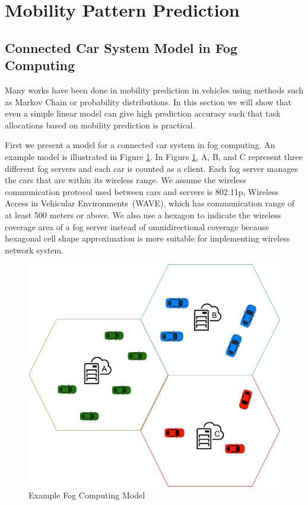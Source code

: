 \section{Mobility Pattern Prediction}
\label{s2}

\subsection{Connected Car System Model in Fog Computing}


Many works have been done in mobility prediction in vehicles using methods such as Markov Chain\cite{sf} or probability distributions\cite{rome}. In this section we will show that even a simple linear model can give high prediction accuracy such that task allocations based on mobility prediction is practical.

First we present a model for a connected car system in fog computing. An example model is illustrated in Figure \ref{carrep}. In Figure \ref{carrep}, A, B, and C represent three different fog servers and each car is counted as a client. Each fog server manages the cars that are within its wireless range. We assume the wireless communication protocol used between cars and servers is 802.11p, Wireless Access in Vehicular Environments (WAVE)\cite{wave}, which has communication range of at least 500 meters or above\cite{waver}. We also use a hexagon to indicate the wireless coverage area of a fog server instead of omnidirectional coverage because hexagonal cell shape approximation is more suitable for implementing wireless network system\cite{hex}. 

\begin{figure}[h!]
\centering
\includegraphics[width=0.75\linewidth]{images/car_rep}
\caption{Example Fog Computing Model}
\label{carrep}
\end{figure}



